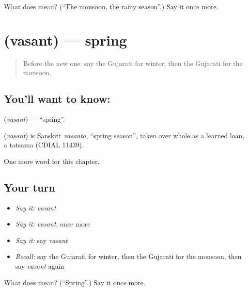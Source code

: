 \begin{tcolorbox}[breakable,colback=teal!4,colframe=teal!35!black,title={Before you move on}]
What does  mean? (\textquotedblleft{}The monsoon, the rainy season\textquotedblright{}.) Say it once more.
\end{tcolorbox}
\section[\texorpdfstring{\gu{વસંત} (vasant)}{વસંત (vasant)}]{ (vasant) — spring}

\label{lesson:GU-C93-vasant}



\begin{quote}
Before the new one: say the Gujarati for winter, then the Gujarati for the monsoon.
\end{quote}

\subsection*{You'll want to know: }
\textbf{} (\emph{vasant}) — \textquotedblleft{}spring\textquotedblright{}.

\begin{cousinweb}
\textbf{} (\emph{vasant}) is Sanskrit \emph{vasanta}, \textquotedblleft{}spring season\textquotedblright{}, taken over whole as a learned loan, a tatsama (CDIAL 11439).
\end{cousinweb}

\begin{grammarlens}[title={What you've built}]
One more word for this chapter.
\end{grammarlens}

\subsection*{Your turn}
\begin{itemize}
\raggedright
  \item \emph{Say it:} \emph{vasant}
  \item \emph{Say it:} \emph{vasant}, once more
  \item \emph{Say it:} say \emph{vasant}
  \item \emph{Recall:} say the Gujarati for winter, then the Gujarati for the monsoon, then say \emph{vasant} again
\end{itemize}

\begin{tcolorbox}[breakable,colback=teal!4,colframe=teal!35!black,title={Before you move on}]
What does  mean? (\textquotedblleft{}Spring\textquotedblright{}.) Say it once more.
\end{tcolorbox}
